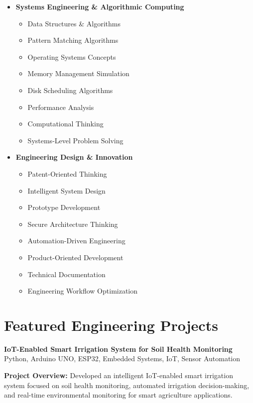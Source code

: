 \documentclass[a4paper,11pt]{article}
\newcommand{\resumeProject}[2]{
\textbf{#1} \hfill {\small #2}
}
\begin{document}
\begin{itemize}[leftmargin=0.15in]
\item \textbf{Systems Engineering \& Algorithmic Computing}
\begin{itemize}
    \item Data Structures \& Algorithms
    \item Pattern Matching Algorithms
    \item Operating Systems Concepts
    \item Memory Management Simulation
    \item Disk Scheduling Algorithms
    \item Performance Analysis
    \item Computational Thinking
    \item Systems-Level Problem Solving
\end{itemize}

\item \textbf{Engineering Design \& Innovation}
\begin{itemize}
    \item Patent-Oriented Thinking
    \item Intelligent System Design
    \item Prototype Development
    \item Secure Architecture Thinking
    \item Automation-Driven Engineering
    \item Product-Oriented Development
    \item Technical Documentation
    \item Engineering Workflow Optimization
\end{itemize}

\end{itemize}







\section{Featured Engineering Projects}

\resumeProject
{IoT-Enabled Smart Irrigation System for Soil Health Monitoring}
{Python, Arduino UNO, ESP32, Embedded Systems, IoT, Sensor Automation}

\textbf{Project Overview:}
Developed an intelligent IoT-enabled smart irrigation system focused on soil health monitoring, automated irrigation decision-making, and real-time environmental monitoring for smart agriculture applications.
\end{document}

